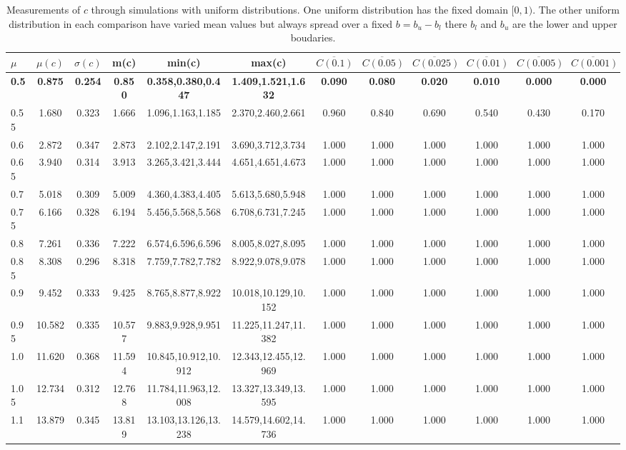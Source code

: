 \begin{table*}[h!]
\begin{center}
\begin{tabular}{| l | c | c | c | c | c | c | c | c | c | c | c |}\hline
$\mu$ & $\mu(c)$ & $\sigma(c)$ & m(c) & min(c) & max(c) & $\overline{C(0.1)}$ & $\overline{C(0.05)}$ & $\overline{C(0.025)}$ & $\overline{C(0.01)}$ & $\overline{C(0.005)}$ & $\overline{C(0.001)}$ \\\hline\hline
{\bf 0.5} & {\bf 0.875} & {\bf 0.254} & {\bf 0.850} & {\bf 0.358,0.380,0.447} & {\bf 1.409,1.521,1.632} & {\bf 0.090} & {\bf 0.080} & {\bf 0.020} & {\bf 0.010} & {\bf 0.000} & {\bf 0.000} \\\hline
0.55 & 1.680 & 0.323 & 1.666 & 1.096,1.163,1.185 & 2.370,2.460,2.661  & 0.960  & 0.840  & 0.690  & 0.540  & 0.430  & 0.170 \\\hline
0.6 & 2.872 & 0.347 & 2.873 & 2.102,2.147,2.191 & 3.690,3.712,3.734  & 1.000  & 1.000  & 1.000  & 1.000  & 1.000  & 1.000 \\\hline
0.65 & 3.940 & 0.314 & 3.913 & 3.265,3.421,3.444 & 4.651,4.651,4.673  & 1.000  & 1.000  & 1.000  & 1.000  & 1.000  & 1.000 \\\hline
0.7 & 5.018 & 0.309 & 5.009 & 4.360,4.383,4.405 & 5.613,5.680,5.948  & 1.000  & 1.000  & 1.000  & 1.000  & 1.000  & 1.000 \\\hline
0.75 & 6.166 & 0.328 & 6.194 & 5.456,5.568,5.568 & 6.708,6.731,7.245  & 1.000  & 1.000  & 1.000  & 1.000  & 1.000  & 1.000 \\\hline
0.8 & 7.261 & 0.336 & 7.222 & 6.574,6.596,6.596 & 8.005,8.027,8.095  & 1.000  & 1.000  & 1.000  & 1.000  & 1.000  & 1.000 \\\hline
0.85 & 8.308 & 0.296 & 8.318 & 7.759,7.782,7.782 & 8.922,9.078,9.078  & 1.000  & 1.000  & 1.000  & 1.000  & 1.000  & 1.000 \\\hline
0.9 & 9.452 & 0.333 & 9.425 & 8.765,8.877,8.922 & 10.018,10.129,10.152  & 1.000  & 1.000  & 1.000  & 1.000  & 1.000  & 1.000 \\\hline
0.95 & 10.582 & 0.335 & 10.577 & 9.883,9.928,9.951 & 11.225,11.247,11.382  & 1.000  & 1.000  & 1.000  & 1.000  & 1.000  & 1.000 \\\hline
1.0 & 11.620 & 0.368 & 11.594 & 10.845,10.912,10.912 & 12.343,12.455,12.969  & 1.000  & 1.000  & 1.000  & 1.000  & 1.000  & 1.000 \\\hline
1.05 & 12.734 & 0.312 & 12.768 & 11.784,11.963,12.008 & 13.327,13.349,13.595  & 1.000  & 1.000  & 1.000  & 1.000  & 1.000  & 1.000 \\\hline
1.1 & 13.879 & 0.345 & 13.819 & 13.103,13.126,13.238 & 14.579,14.602,14.736  & 1.000  & 1.000  & 1.000  & 1.000  & 1.000  & 1.000 \\\hline
\end{tabular}
\caption{Measurements of $c$ through simulations
with uniform distributions.
One uniform distribution has the fixed domain $[0,1)$.
The other uniform distribution in each comparison
have varied mean values but always
spread over a fixed $b=b_u-b_l$ there $b_l$ and $b_u$ are the lower and upper boudaries.}
\end{center}
\end{table*}